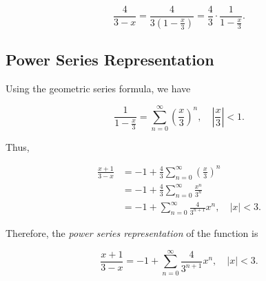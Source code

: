 \[
    \frac{4}{3 - x} = \frac{4}{3(1 - \frac{x}{3})} = \frac{4}{3} \cdot \frac{1}{1 - \frac{x}{3}}.
\]

\subsection{Power Series Representation}

Using the geometric series formula, we have

\[
    \frac{1}{1 - \frac{x}{3}} = \sum_{n=0}^{\infty} {\left( \frac{x}{3} \right)}^n, \quad \left| \frac{x}{3} \right| < 1.
\]

Thus,

\begin{align*}
    \frac{x + 1}{3 - x} &= -1 + \frac{4}{3} \sum_{n=0}^{\infty} {\left( \frac{x}{3} \right)}^n \\
    &= -1 + \frac{4}{3} \sum_{n=0}^{\infty} \frac{x^n}{3^n} \\
    &= -1 + \sum_{n=0}^{\infty} \frac{4}{3^{n+1}} x^n, \quad |x| < 3.
\end{align*}

Therefore, the \emph{power series representation} of the function is

\[
    \frac{x + 1}{3 - x} = -1 + \sum_{n=0}^{\infty} \frac{4}{3^{n+1}} x^n, \quad |x| < 3.
\]

